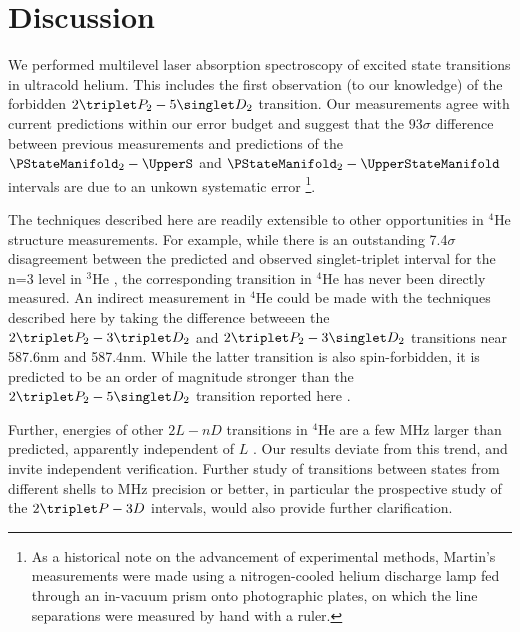 \section{Discussion}

We performed multilevel laser absorption spectroscopy of excited state transitions in ultracold helium. This includes the first observation (to our knowledge) of the forbidden $2\triplet P_2 - 5\singlet D_2$ transition. Our measurements agree with current predictions within our error budget and suggest that the $93\sigma$ difference between previous measurements \cite{Martin60} and predictions \cite{Morton06} of the $\PStateManifold_2  -  \UpperS$ and $\PStateManifold_2  -  \UpperStateManifold$ intervals are due to an unkown systematic error \footnote{As a historical note on the advancement of experimental methods, Martin's measurements were made using a nitrogen-cooled helium discharge lamp fed through an in-vacuum prism onto photographic plates, on which the line separations were measured by hand with a ruler.}. %

The techniques described here are readily extensible to other opportunities in $^4$He structure measurements. For example, while there is an outstanding 7.4$\sigma$ disagreement between the predicted and observed singlet-triplet interval for the n=3 level in $^3$He \cite{Morton06,Derouard80}, the corresponding transition in $^4$He has never been directly measured. An indirect measurement in $^4$He could be made with the techniques described here by taking the difference betweeen the $2\triplet P_2 - 3\triplet D_2$ and $2\triplet P_2 - 3\singlet D_2$ transitions near 587.6nm and 587.4nm. While the latter transition is also spin-forbidden, it is predicted to be an order of magnitude stronger than the $2\triplet P_2 - 5\singlet D_2$ transition reported here \cite{Morton06}.

{Further, energies of other $2L-nD$ transitions in $^4$He are a few MHz larger than predicted, apparently independent of $L$ \cite{Wienczek19,Yerokhin20}. Our results deviate from this trend, and invite independent verification. Further study of transitions between states from different shells to MHz precision or better, in particular the prospective study of the $2\triplet P - 3 D$ intervals, would also provide further clarification.}

